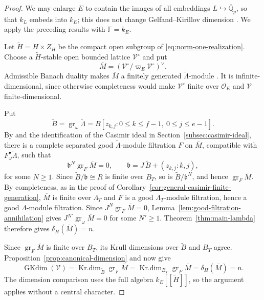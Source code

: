 \documentclass[11pt]{article}
\numberwithin{equation}{section}
\theoremstyle{definition}
\theoremstyle{remark}
\newcommand{\F}{\mathbb F}
\newcommand{\Q}{\mathbb Q}
\newcommand{\cO}{\mathcal O}
\DeclareMathOperator{\gr}{gr}
\DeclareMathOperator{\GKdim}{GKdim}
\DeclareMathOperator{\Krdim}{Kr.dim}
\begin{document}
\begin{proof}
We may enlarge $E$ to contain the images of all embeddings
$L\hookrightarrow\overline{\Q}_p$, so that $k_L$ embeds into $k_E$;
this does not change Gelfand--Kirillov dimension
\cite[Lemma~6.1]{Sor26b}. We apply the preceding results with $\F=k_E$.

Let $\widetilde H=H\times Z_H$ be the compact open subgroup of
\eqref{eq:norm-one-realization}. Choose a $\widetilde H$-stable
open bounded lattice $\mathcal V^\circ$ and put
\[
 \overline M=(\mathcal V^\circ/\varpi_E\mathcal V^\circ)^\vee.
\]
Admissible Banach duality makes $\overline M$ a finitely generated
$\widetilde\Lambda$-module \cite[\S\S~2.1 and 2.3]{Sor26b}.
It is infinite-dimensional, since otherwise completeness would make
$\mathcal V^\circ$ finite over $\cO_E$ and $\mathcal V$ finite-dimensional.

Put
\[
 \widetilde B=\gr_\omega\widetilde\Lambda
   =B[z_{k,j}:0\leq k\leq f-1,\ 0\leq j\leq e-1].
\]
By \cite[proof of Thm.~6.2, (24)]{Sor26b} and the identification
of the Casimir ideal in Section~\ref{subsec:casimir-ideal},
there is a complete separated good $\widetilde\Lambda$-module
filtration $F$ on $\overline M$, compatible with
$F_\omega^\bullet\widetilde\Lambda$, such that
\[
 \mathfrak b^N\gr_F\overline M=0,
 \qquad \mathfrak b=J\,\widetilde B+(z_{k,j}:k,j),
\]
for some $N\geq1$.
Since $\widetilde B/\mathfrak b\cong R$ is finite over $B_T$,
so is $\widetilde B/\mathfrak b^N$, and hence $\gr_F\overline M$.
By completeness, as in the proof of
Corollary~\ref{cor:general-casimir-finite-generation},
$\overline M$ is finite over $\Lambda_T$ and $F$ is a good
$\Lambda_T$-module filtration, hence a good $\Lambda$-module filtration.
Since $J^N\gr_F\overline M=0$, Lemma~\ref{lem:good-filtration-annihilation}
gives $J^{N'}\gr_\omega\overline M=0$ for some $N'\geq1$.
Theorem~\ref{thm:main-lambda} therefore gives $\delta_H(\overline M)=n$.

Since $\gr_F\overline M$ is finite over $B_T$, its Krull dimensions
over $\widetilde B$ and $B_T$ agree. Proposition~\ref{prop:canonical-dimension}
and \cite[Prop.~6.1]{Sor26b} now give
\[
 \GKdim(\mathcal V)
   =\Krdim_{\widetilde B}\gr_F\overline M
   =\Krdim_{B_T}\gr_F\overline M
   =\delta_H(\overline M)=n.
\]
The dimension comparison uses the full algebra
$k_E[[\widetilde H]]$, so the argument applies without a central character.
\end{proof}
\end{document}
